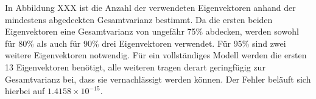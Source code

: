 \documentclass[]{report}
\begin{document}
\begin{enumerate}
\begin{enumerate}
		In Abbildung XXX %
		ist die Anzahl der verwendeten Eigenvektoren anhand der mindestens abgedeckten Gesamtvarianz bestimmt. Da die ersten beiden Eigenvektoren eine Gesamtvarianz von  ungefähr 75\% abdecken, werden sowohl für 80\% als auch für 90\% drei Eigenvektoren verwendet. Für 95\% sind zwei weitere Eigenvektoren notwendig. Für ein vollständiges Modell werden die ersten 13 Eigenvektoren benötigt, alle weiteren tragen derart geringfügig zur Gesamtvarianz bei, dass sie vernachlässigt werden können. Der Fehler beläuft sich hierbei auf $1.4158\times 10^{-15}$.
	\end{enumerate}
\end{enumerate}
\end{document}
